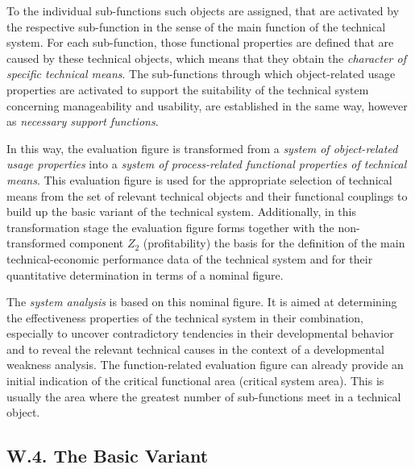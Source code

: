 \documentclass[11pt,a4paper]{article}
\begin{document}
To the individual sub-functions such objects are assigned, that are activated
by the respective sub-function in the sense of the main function of the
technical system. For each sub-function, those functional properties are
defined that are caused by these technical objects, which means that they
obtain the \emph{character of specific technical means}. The sub-functions
through which object-related usage properties are activated to support the
suitability of the technical system concerning manageability and usability,
are established in the same way, however as \emph{necessary support
  functions}.

In this way, the evaluation figure is transformed from a \emph{system of
  object-related usage properties} into a \emph{system of process-related
  functional properties of technical means}. This evaluation figure is used
for the appropriate selection of technical means from the set of relevant
technical objects and their functional couplings to build up the basic variant
of the technical system. Additionally, in this transformation stage the
evaluation figure forms together with the non-transformed component $Z_2$
(profitability) the basis for the definition of the main technical-economic
performance data of the technical system and for their quantitative
determination in terms of a nominal figure.

The \emph{system analysis} is based on this nominal figure. It is aimed at
determining the effectiveness properties of the technical system in their
combination, especially to uncover contradictory tendencies in their
developmental behavior and to reveal the relevant technical causes in the
context of a developmental weakness analysis. The function-related evaluation
figure can already provide an initial indication of the critical functional
area (critical system area). This is usually the area where the greatest
number of sub-functions meet in a technical object.

\subsection*{W.4. The Basic Variant}
\end{document}
